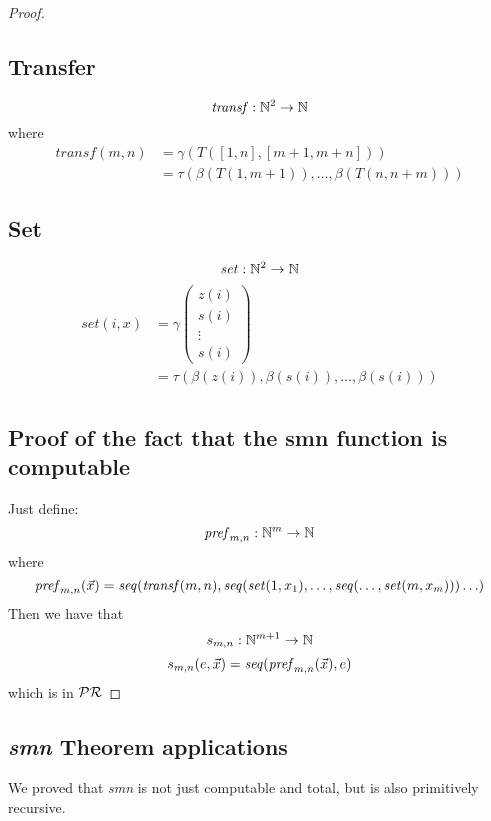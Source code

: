 \begin{theorem}
\begin{proof}
\subsection*{Transfer}
    \newcommand{\tran}[1]{\ensuremath{\mathit{transf}({#1})}}
    \[
      \mathit{transf}: \mathbb{N}^2 \rightarrow \mathbb{N}
    \]
where
\begin{align*}
\tran{m,n} &= \gamma(T([1,n],[m+1, m+n])) \\
&= \tau(\beta(T(1,m+1)), \dots, \beta(T(n,n+m))) 
\end{align*}

\noindent
\subsection*{Set}
    \newcommand{\set}[1]{\ensuremath{\mathit{set}({#1})}}
    \[
      \mathit{set} : \mathbb{N}^2 \rightarrow \mathbb{N}
    \]
\begin{align*}
  \set{i,x} &= \gamma\left( \begin{array}{c}
    z(i) \\
    s(i) \\
    \vdots \\
    s(i)
  \end{array} \right) \\
&= \tau(\beta(z(i)), \beta(s(i)), \dots, \beta(s(i))) \\
\end{align*}

\subsection*{Proof of the fact that the smn function is computable}
    Just define:
    \newcommand{\pref}[1]{\ensuremath{\mathit{pref}_{m,n}({#1})}}
    \[
      \mathit{pref}_{m,n}: \mathbb{N}^m \rightarrow \mathbb{N}
    \]
where
    \[
      \pref{\vec{x}} = \seq{\tran{m,n}, \seq{\set{1,x_1},\dots, \seq{\dots , \set{m,x_m}}} \dots}
    \]
    Then we have that
    \[
      s_{m,n}: \mathbb{N}^{m+1} \rightarrow \mathbb{N}
    \]
    \[
      s_{m,n}(e, \vec{x}) = \seq{\pref{\vec{x}}, e}
    \]
    which is in $\mathcal{PR}$
  \end{proof}
\end{theorem}

\subsection*{\emph{smn} Theorem applications}
\begin{observation}
  We proved that \emph{smn} is not just computable and total,
but is also primitively recursive. 
\end{observation}

